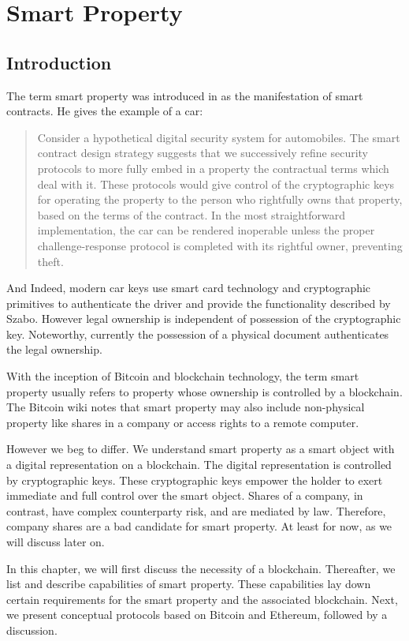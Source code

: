 \chapter{Smart Property}
\label{sec:dao}


\section{Introduction}

The term smart property was introduced in \cite{szabo1997} as the manifestation of smart contracts. He gives the example of a car:
\begin{quote}
Consider a hypothetical digital security system for automobiles. The smart contract design strategy suggests that we successively refine security protocols to more fully embed in a property the contractual terms which deal with it. These protocols would give control of the cryptographic keys for operating the property to the person who rightfully owns that property, based on the terms of the contract. In the most straightforward implementation, the car can be rendered inoperable unless the proper challenge-response protocol is completed with its rightful owner, preventing theft.
\end{quote}

And Indeed, modern car keys use smart card technology and cryptographic primitives to authenticate the driver and provide the functionality described by Szabo. However legal ownership is independent of possession of the cryptographic key. Noteworthy, currently the possession of a physical document authenticates the legal ownership. 

With the inception of Bitcoin and blockchain technology, the term smart property usually refers to property whose ownership is controlled by a blockchain.
The Bitcoin wiki notes that smart property may also include non-physical property like shares in a company or access rights to a remote computer. 

However we beg to differ. We understand smart property as a smart object with a digital representation on a blockchain. The digital representation is controlled by cryptographic keys. These cryptographic keys empower the holder to exert immediate and full control over the smart object. Shares of a company, in contrast, have complex counterparty risk, and are mediated by law. Therefore, company shares are a bad candidate for smart property. At least for now, as we will discuss later on. 

In this chapter, we will first discuss the necessity of a blockchain. Thereafter, we list and describe capabilities of smart property. These capabilities lay down certain requirements for the smart property and the associated blockchain. Next, we present conceptual protocols based on Bitcoin and Ethereum, followed by a discussion. 

